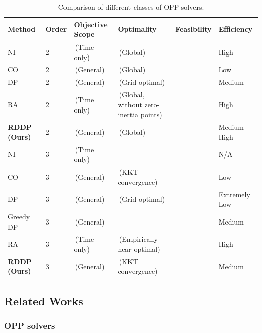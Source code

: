 \documentclass[journal]{IEEEtran}
\theoremstyle{definition}
\theoremstyle{definition}
\newcommand{\symbox}[1]{\makebox[0.8em][c]{#1}}
\newcommand{\cmark}{\symbox{\ding{51}}}
\newcommand{\xmark}{\symbox{\ding{55}}}
\begin{document}
\begin{table}[!t]
    \centering
    \caption{Comparison of different classes of OPP solvers.}
    \label{tab:related_works}
    \begin{tabular}{llllll}
        \toprule
        Method & Order & Objective Scope & Optimality & Feasibility & Efficiency \\ \midrule
        NI \cite{pham2014general} & 2 & \xmark\,(Time only) & \cmark\,(Global) & \cmark & High \\
        CO \cite{verscheure2009time,hauser2014fast} & 2 & \cmark\,(General) & \cmark\,(Global) & \cmark & Low \\
        DP \cite{shin1986dynamic} & 2 & \cmark\,(General) & \cmark\,(Grid-optimal) & \cmark & Medium \\
        RA \cite{pham2018new} & 2 & \xmark\,(Time only) & \cmark\,(Global, without zero-inertia points) & \cmark & High \\
        \textbf{RDDP (Ours)} & 2 & \cmark\,(General) & \cmark\,(Global) & \cmark & Medium--High \\ \midrule
        NI \cite{pham2017structure} & 3 & \xmark\,(Time only) & \xmark & \xmark & N/A \\
        CO \cite{debrouwere2013time,wang2026online} & 3 & \cmark\,(General) & \cmark\,(KKT convergence) & \cmark & Low \\
        DP \cite{shin1986dynamic} & 3 & \cmark\,(General) & \cmark\,(Grid-optimal) & \cmark & Extremely Low \\
        Greedy DP \cite{kaserer2019nearly} & 3 & \cmark\,(General) & \xmark & \xmark & Medium \\
        RA \cite{dio2025time} & 3 & \xmark\,(Time only) & \cmark\,(Empirically near optimal) & \cmark & High \\
        \textbf{RDDP (Ours)} & 3 & \cmark\,(General) & \cmark\,(KKT convergence) & \cmark & Medium \\ \bottomrule
    \end{tabular}
\end{table}

\subsection{Related Works}\label{subsec:related_works}

\subsubsection{OPP solvers}\label{sub2sec:review_opp_solvers}
\end{document}
